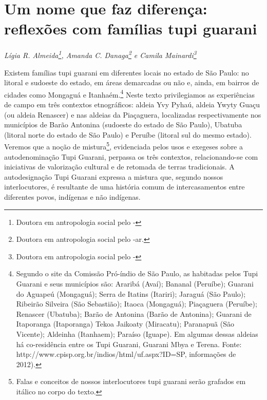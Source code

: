 {{\chapter{Um nome que faz diferença: reflexões com famílias tupi guarani}
\begin{flushright}
\emph{Lígia R. Almeida\footnote{Doutora em antropologia social pelo
-}, Amanda C. Danaga\footnote{Doutora em antropologia
social pelo -ar.} e Camila Mainardi\footnote{Doutora em antropologia social pelo -}}
\end{flushright}
\medskip
%

Existem famílias tupi guarani em diferentes locais no estado de São
Paulo: no litoral e sudoeste do estado, em áreas demarcadas ou não e,
ainda, em bairros de cidades como Mongaguá e Itanhaém.\footnote{Segundo
o site da Comissão Pró-índio de São Paulo, as  habitadas pelos Tupi
Guarani e seus municípios são: Araribá (Avaí); Bananal (Peruíbe);
Guarani do Aguapeú (Mongaguá); Serra de Itatins (Itariri); Jaraguá (São
Paulo); Ribeirão Silveira (São Sebastião); Itaoca (Mongaguá);
Piaçaguera (Peruíbe); Renascer (Ubatuba); Barão de Antonina (Barão de
Antonina); Guarani de Itaporanga (Itaporanga) Tekoa Jaikoaty
(Miracatu); Paranapuã (São Vicente); Aldeinha (Itanhaem); Paraíso
(Iguape). Em algumas dessas aldeias há co-residência entre os Tupi
Guarani, Guarani Mbya e Terena. Fonte: http://www.cpisp.org.br/indios/html/uf.aspx?ID=SP, informações de
2012).} Neste texto privilegiamos as experiências de campo em três
contextos etnográficos: aldeia Yvy Pyhaú, aldeia Ywyty Guaçu (ou aldeia
Renascer) e nas aldeias da  Piaçaguera, localizadas respectivamente
nos municípios de Barão Antonina (sudoeste do estado de São Paulo),
Ubatuba (litoral norte do estado de São Paulo) e Peruíbe (litoral sul
do mesmo estado). Veremos que a noção de mistura\footnote{Falas e
conceitos de nossos interlocutores tupi guarani serão grafados em
itálico no corpo do texto.}, evidenciada pelos usos e exegeses sobre a
autodenominação Tupi Guarani, perpassa os três contextos,
relacionando-se com iniciativas de valorização cultural e de retomada
de terras tradicionais. A autodesignação Tupi Guarani expressa a
mistura que, segundo nossos interlocutores, é resultante de uma história
comum de intercasamentos entre diferentes povos, indígenas e não
indígenas. 

}}
